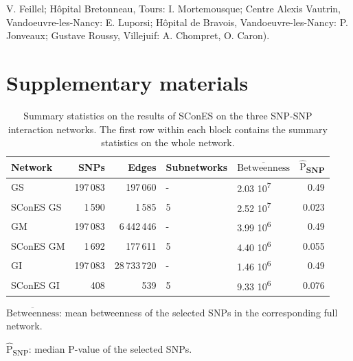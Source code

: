 \documentclass[twocolumn, 11pt, draft]{article}
\newcommand{\mean}[1]{$\overline{\mbox{#1}}$}
\newcommand{\median}[1]{$\hat{\mbox{#1}}$}
\begin{document}
V. Feillel; Hôpital Bretonneau, Tours: I. Mortemousque; Centre Alexis Vautrin, Vandoeuvre-les-Nancy: E. Luporsi; Hôpital de Bravois, Vandoeuvre-les-Nancy: P. Jonveaux; Gustave Roussy, Villejuif: A. Chompret, O. Caron). 




\clearpage
\setcounter{figure}{0}
\setcounter{section}{0}
\setcounter{table}{0}

\section*{Supplementary materials}

\begin{table}[htbp]
\begin{threeparttable}
\caption{\label{tab:snp_solutions}
Summary statistics on the results of SConES on the three SNP-SNP interaction networks. The first row within each block contains the summary statistics on the whole network.}
\centering
\begin{tabular}{lrrllr}
Network & SNPs & Edges & Subnetworks & \mean{Betweenness} & \median{P}\textsubscript{SNP}\\
\hline
GS & 197\,083 & 197\,060 & - & 2.03 \texttimes{} 10\textsuperscript{7} & 0.49\\
SConES GS & 1\,590 & 1\,585 & 5 & 2.52 \texttimes{} 10\textsuperscript{7} & 0.023\\
\hline
GM & 197\,083 & 6\,442\,446 & - & 3.99 \texttimes{} 10\textsuperscript{6} & 0.49\\
SConES GM & 1\,692 & 177\,611 & 5 & 4.40 \texttimes{} 10\textsuperscript{6} & 0.055\\
\hline
GI & 197\,083 & 28\,733\,720 & - & 1.46 \texttimes{} 10\textsuperscript{6} & 0.49\\
SConES GI & 408 & 539 & 5 & 9.33 \texttimes{} 10\textsuperscript{6} & 0.076\\
\end{tabular}
\begin{tablenotes}
\item \mean{Betweenness}: mean betweenness of the selected SNPs in the corresponding full network.
\item \median{P}\textsubscript{SNP}: median P-value of the selected SNPs.
\end{tablenotes}
\end{threeparttable}
\end{table}
\end{document}
